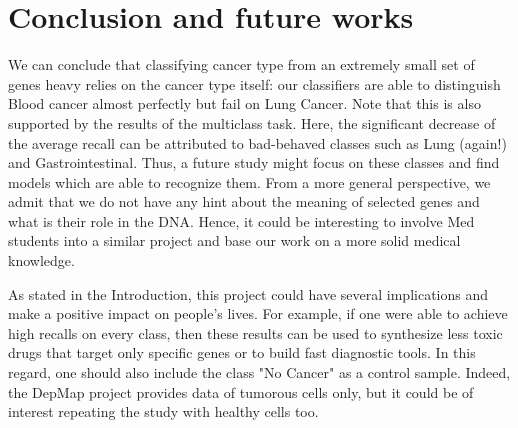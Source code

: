 \documentclass[a4paper,11pt, oneside]{article}  %
\begin{document}
\section{Conclusion and future works}
We can conclude that classifying cancer type from an extremely small set of genes heavy relies on the cancer type itself: our classifiers are able to distinguish Blood cancer almost perfectly but fail on Lung Cancer.  Note that this is also supported by the results of the multiclass task. Here, the significant decrease of the average recall can be attributed to bad-behaved classes such as Lung (again!) and Gastrointestinal. Thus, a future study might focus on these classes and find models which are able to recognize them.  From a more general perspective,  we admit that we do not have any hint about the meaning of selected genes and what is their role in the DNA.  Hence, it could be interesting to involve Med students into a similar project and base our work on a more solid medical knowledge.  

As stated in the Introduction, this project could have several implications and make a positive impact on people's lives. For example, if one were able to achieve high recalls on every class, then these results can be used to synthesize less toxic drugs that target only specific genes or to build fast diagnostic tools. In this regard, one should also include the class "No Cancer" as a control sample. Indeed, the DepMap project provides data of tumorous cells only, but it could be of interest repeating the study with healthy cells too.  
\end{document}

